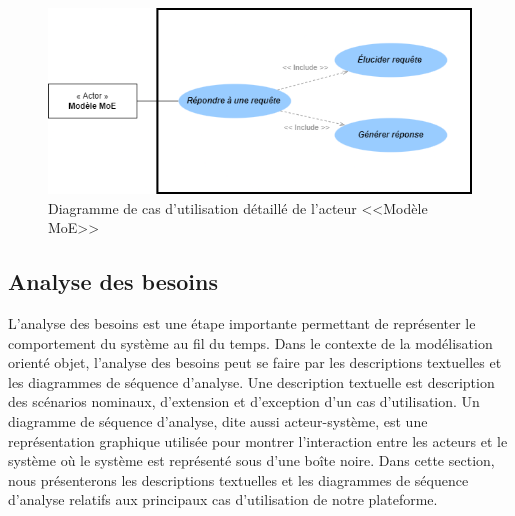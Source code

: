 \begin{figure}[H]
    \centering
    \includegraphics[width=\textwidth,height=0.3\textheight]{images/chp3/fig5.png}
    \caption{Diagramme de cas d’utilisation détaillé de l’acteur <<Modèle MoE>>}
    \label{fig: Diagramme de cas d’utilisation détaillé de l’acteur <<Modèle MoE>>>}    
\end{figure}

\subsection{Analyse des besoins}
L'analyse des besoins est une étape importante permettant de représenter le comportement du système au fil du temps. Dans le contexte de la modélisation orienté objet, l’analyse des besoins peut se faire par les descriptions textuelles et les diagrammes de séquence d'analyse. Une description textuelle est description des scénarios nominaux, d'extension et d'exception d’un cas d'utilisation. Un diagramme de séquence d'analyse, dite aussi acteur-système, est une représentation graphique utilisée pour montrer l’interaction entre les acteurs et le système où le système est représenté sous d'une boîte noire. Dans cette section, nous présenterons les descriptions textuelles et les diagrammes de séquence d'analyse relatifs aux principaux cas d’utilisation de notre plateforme.

